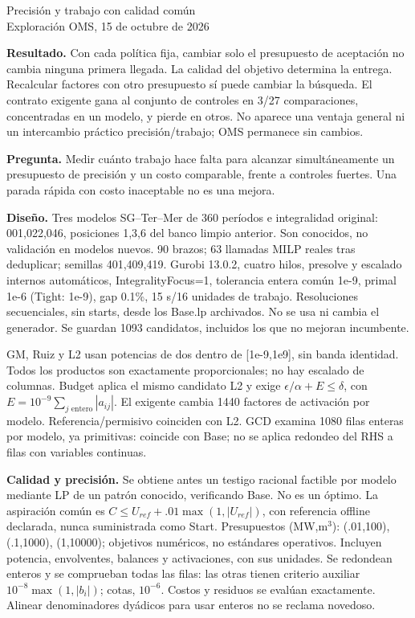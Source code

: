 \documentclass[11pt,a4paper]{article}
\begin{document}
\begin{center}{\Large Precisión y trabajo con calidad común}\\[4pt]Exploración OMS, 15 de octubre de 2026\end{center}
\textbf{Resultado.} Con cada política fija, cambiar solo el presupuesto de aceptación no cambia ninguna primera llegada. La calidad del objetivo determina la entrega. Recalcular factores con otro presupuesto sí puede cambiar la búsqueda. El contrato exigente gana al conjunto de controles en 3/27 comparaciones, concentradas en un modelo, y pierde en otros. No aparece una ventaja general ni un intercambio práctico precisión/trabajo; OMS permanece sin cambios.

\textbf{Pregunta.} Medir cuánto trabajo hace falta para alcanzar simultáneamente
un presupuesto de precisión y un costo comparable, frente a controles fuertes.
Una parada rápida con costo inaceptable no es una mejora.

\textbf{Diseño.} Tres modelos SG--Ter--Mer de 360 períodos e integralidad
original: 001,022,046, posiciones 1,3,6 del banco limpio anterior. Son conocidos,
no validación en modelos nuevos. 90 brazos; 63 llamadas MILP reales tras
deduplicar; semillas 401,409,419. Gurobi 13.0.2, cuatro hilos, presolve y escalado
internos automáticos, IntegralityFocus=1, tolerancia entera común 1e-9, primal
1e-6 (Tight: 1e-9), gap 0.1\%, 15 s/16 unidades de trabajo. Resoluciones
secuenciales, sin starts, desde los Base.lp archivados. No se usa ni cambia el
generador. Se guardan 1093 candidatos, incluidos los que no mejoran incumbente.

GM, Ruiz y L2 usan potencias de dos dentro de [1e-9,1e9], sin banda identidad.
Todos los productos son exactamente proporcionales; no hay escalado de columnas.
Budget aplica el mismo candidato L2 y exige $\epsilon/\alpha+E\leq\delta$, con
$E=10^{-9}\sum_{j\text{ entero}}|a_{ij}|$. El exigente cambia 1440 factores
de activación por modelo. Referencia/permisivo coinciden con L2. GCD examina
1080 filas enteras por modelo, ya primitivas: coincide con Base; no se aplica
redondeo del RHS a filas con variables continuas.

\textbf{Calidad y precisión.} Se obtiene antes un testigo racional factible por
modelo mediante LP de un patrón conocido, verificando Base. No es un óptimo.
La aspiración común es $C\leq U_{ref}+.01\max(1,|U_{ref}|)$, con referencia
offline declarada, nunca suministrada como Start. Presupuestos (MW,m$^3$):
(.01,100), (.1,1000), (1,10000); objetivos numéricos, no estándares operativos.
Incluyen potencia, envolventes, balances y activaciones, con sus unidades.
Se redondean enteros y se comprueban todas las filas: las otras tienen criterio
auxiliar $10^{-8}\max(1,|b_i|)$; cotas, $10^{-6}$. Costos y residuos se evalúan
exactamente. Alinear denominadores dyádicos para usar enteros no se reclama novedoso.
\end{document}
